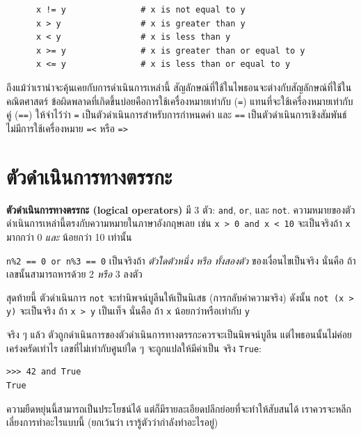 \begin{verbatim}
      x != y               # x is not equal to y
      x > y                # x is greater than y
      x < y                # x is less than y
      x >= y               # x is greater than or equal to y
      x <= y               # x is less than or equal to y
\end{verbatim}
%
ถึงแม้ว่าเราน่าจะคุ้นเคยกับการดำเนินการเหล่านี้ สัญลักษณ์ที่ใช้ในไพธอนจะต่างกับสัญลักษณ์ที่ใช้ในคณิตศาสตร์
ข้อผิดพลาดที่เกิดขึ้นบ่อยคือการใช้เครื่องหมายเท่ากับ ({\tt =}) แทนที่จะใช้เครื่องหมายเท่ากับคู่ ({\tt ==})
ให้จำไว้ว่า {\tt =} เป็นตัวดำเนินการสำหรับการกำหนดค่า และ {\tt ==} เป็นตัวดำเนินการเชิงสัมพันธ์
ไม่มีการใช้เครื่องหมาย {\tt =<} หรือ {\tt =>}


\section {ตัวดำเนินการทางตรรกะ} %

{\bf ตัวดำเนินการทางตรรกะ (logical operators)} มี 3 ตัว:  {\tt and}, {\tt or}, 
และ {\tt not}. ความหมายของตัวดำเนินการเหล่านี้ตรงกับความหมายในภาษาอังกฤษเลย เช่น 
{\tt x > 0 and x < 10} จะเป็นจริงถ้า {\tt x} มากกว่า 0 {\em และ} น้อยกว่า 10 เท่านั้น

{\tt n\%2 == 0 or n\%3 == 0} เป็นจริงถ้า {\em ตัวใดตัวหนึ่ง หรือ ทั้งสองตัว} ของเงื่อนไขเป็นจริง 
นั่นคือ ถ้าเลขนั้นสามารถหารด้วย 2 {\em หรือ} 3 ลงตัว

สุดท้ายนี้ ตัวดำเนินการ {\tt not} จะทำนิพจน์บูลีนให้เป็นนิเสธ (การกลับค่าความจริง) ดังนั้น  
{\tt not (x > y)} จะเป็นจริง ถ้า {\tt x > y} เป็นเท็จ  นั่นคือ ถ้า {\tt x} น้อยกว่าหรือเท่ากับ {\tt y}

จริง ๆ แล้ว ตัวถูกดำเนินการของตัวดำเนินการทางตรรกะควรจะเป็นนิพจน์บูลีน แต่ไพธอนนั้นไม่ค่อยเคร่งครัดเท่าไร
เลขที่ไม่เท่ากับศูนย์ใด ๆ จะถูกแปลให้มีค่าเป็น จริง {\tt True}:

\begin{verbatim}
>>> 42 and True
True
\end{verbatim}
%
ความยืดหยุ่นนี้สามารถเป็นประโยชน์ได้ แต่ก็มีรายละเอียดปลีกย่อยที่จะทำให้สับสนได้ 
เราควรจะหลีกเลี่ยงการทำอะไรแบบนี้ (ยกเว้นว่า เรารู้ตัวว่ากำลังทำอะไรอยู่)


